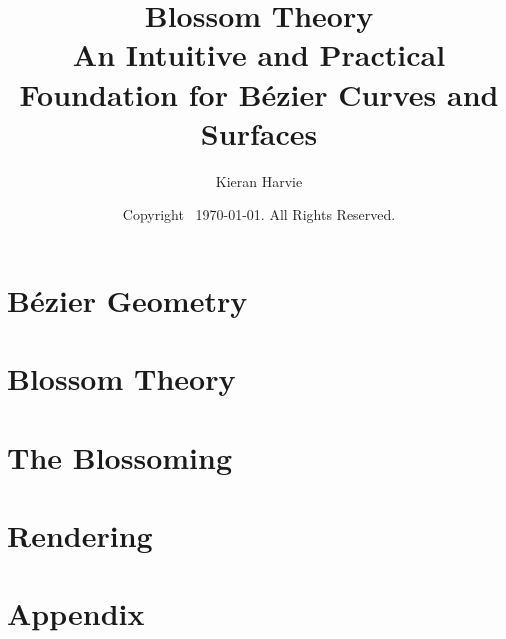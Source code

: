 \documentclass[12pt]{report}
\title{Blossom Theory\\ \large An Intuitive and Practical Foundation for Bézier Curves and Surfaces}
\date{Copyright \textcopyright\,  \today. All Rights Reserved.}
\author{Kieran Harvie}
\renewcommand\thesection{\arabic{section}}
\begin{document}
\maketitle




\chapter{Bézier Geometry}






\chapter{Blossom Theory}





\chapter{The Blossoming}




\chapter{Rendering}





\renewcommand\thesection{A\arabic{section}}

\chapter{Appendix}



\printbibliography[heading=bibnumbered]
\end{document}
